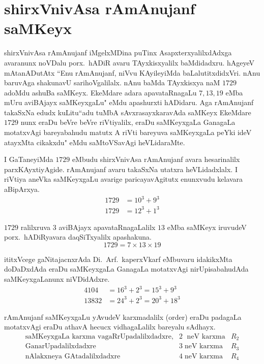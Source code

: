 \chapter{shirxVnivAsa rAmAnujanf saMKeyx}

shirxVnivAsa rAmAnujanf iMgelxMDina puTinx AsapxterxyalilxdAdxga avaranunx noVDalu  porx.~hADiR avaru TAyxkisxyalilx baMdidadxru. hAgeyeV mAtanADutAtx ``Enu rAmAnujanf, niVvu KAyileyiMda baLalutitxdidxVri. nAnu baruvAga shaku\-navU sarihoVgalilalx. nAnu baMda TAyxkisxya naM $1729$ adoMdu ashuBa saMKeyx. EkeMdare adara apavataRnagaLu $7,13,19$ eMba mUru aviBAjayx saMKeyxgaLu" eMdu apa\-shurxti hADidaru. Aga rAmAnujanf takaSxNa edudx kuLitu``adu tuMbA sAvxrasayxkaravAda saMKeyx EkeMdare $1729$ nunx eraDu beVre beVre riVtiyalilx, eraDu saMKeyxgaLa GanagaLa motatxvAgi bareyabahudu matutx A riVti bareyuva saMKeyxgaLa peYki ideV atayxMta cikakxdu" eMdu saMtoVSavAgi heVLidaraMte.

I GaTaneyiMda $1729$ eMbudu shirxVnivAsa rAmAnujanf avara hesarinalilx parxKAyxtiyAgide. rAmAnujanf avaru takaSxNa utatxra heVLidadxlalx. I riVtiya aneVka saMKeyxgaLu avarige paricayavAgitutx enunxvudu kelavara aBipArxya.
\begin{align*}
1729 &= 10^3+9^3\\
1729 &= 12^3+1^3 
\end{align*}

$1729$ ralilxruva $3$ aviBAjayx apavataRnagaLalilx $13$ eMba saMKeyx iruvudeV porx.~hADiRyavara daqSiTxyalilx apashakuna.
$$
1729 = 7\times 13 \times 19
$$

ititxVcege gaNitajacnxrAda Di.~Arf.\ kaperxVkarf eMbuvaru idakikxMta doDaDxdAda eraDu saMKeyxgaLa GanagaLa motatxvAgi nirUpisabahudAda saMKeyxgaLanunx niVDidAdxre.
\begin{align*}
4104 &= 16^3 + 2^3 = 15^3 +9^3\\
13832 &= 24^3 +2^3 = 20^3 +18^3
\end{align*}

rAmAnujanf saMKeyxgaLu yAvudeV karxmadalilx {\rm(order)} eraDu padagaLa motatx\-vAgi eraDu athavA hecucx vidhagaLalilx bareyalu sAdhayx.
$$
\begin{array}{rll}
\text{saMKeyxgaLa karxma vagaRrUpadalilxdadxre,} & 2\; \text{ neV karxma} & R_2\\
\text{GanarUpadalilxdadxre}                      & 3\; \text{neV karxma} & R_3\\
\text{nAlakxneya GAtadalilxdadxre}               & 4\; \text{neV karxma} & R_4
\end{array}
$$

